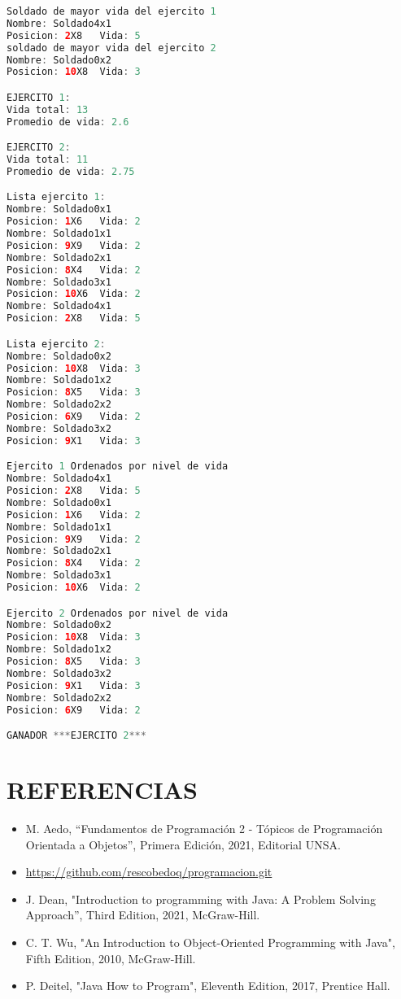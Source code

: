 \documentclass{article}
\begin{document}
\begin{itemize}
\begin{lstlisting}[language=java]
Soldado de mayor vida del ejercito 1
Nombre: Soldado4x1
Posicion: 2X8   Vida: 5
soldado de mayor vida del ejercito 2
Nombre: Soldado0x2
Posicion: 10X8  Vida: 3

EJERCITO 1:
Vida total: 13
Promedio de vida: 2.6

EJERCITO 2:
Vida total: 11
Promedio de vida: 2.75

Lista ejercito 1:
Nombre: Soldado0x1
Posicion: 1X6   Vida: 2
Nombre: Soldado1x1
Posicion: 9X9   Vida: 2
Nombre: Soldado2x1
Posicion: 8X4   Vida: 2
Nombre: Soldado3x1
Posicion: 10X6  Vida: 2
Nombre: Soldado4x1
Posicion: 2X8   Vida: 5

Lista ejercito 2:
Nombre: Soldado0x2
Posicion: 10X8  Vida: 3
Nombre: Soldado1x2
Posicion: 8X5   Vida: 3
Nombre: Soldado2x2
Posicion: 6X9   Vida: 2
Nombre: Soldado3x2
Posicion: 9X1   Vida: 3

Ejercito 1 Ordenados por nivel de vida
Nombre: Soldado4x1
Posicion: 2X8   Vida: 5
Nombre: Soldado0x1
Posicion: 1X6   Vida: 2
Nombre: Soldado1x1
Posicion: 9X9   Vida: 2
Nombre: Soldado2x1
Posicion: 8X4   Vida: 2
Nombre: Soldado3x1
Posicion: 10X6  Vida: 2

Ejercito 2 Ordenados por nivel de vida
Nombre: Soldado0x2
Posicion: 10X8  Vida: 3
Nombre: Soldado1x2
Posicion: 8X5   Vida: 3
Nombre: Soldado3x2
Posicion: 9X1   Vida: 3
Nombre: Soldado2x2
Posicion: 6X9   Vida: 2

GANADOR ***EJERCITO 2***
        \end{lstlisting}

    
	\end{itemize}
	
	\section{REFERENCIAS}
	\begin{itemize}
		\item M. Aedo, “Fundamentos de Programación 2 - Tópicos de Programación Orientada a Objetos”, Primera Edición, 2021, Editorial UNSA.
		\item \url{https://github.com/rescobedoq/programacion.git}
		\item J. Dean, "Introduction to programming with Java: A Problem Solving Approach”, Third Edition, 2021, McGraw-Hill.
        \item C. T. Wu, "An Introduction to Object-Oriented Programming with Java", Fifth Edition, 2010, McGraw-Hill.
        \item P. Deitel, "Java How to Program", Eleventh Edition, 2017, Prentice Hall.
	\end{itemize}
	
%
%
%
			
\end{document}
